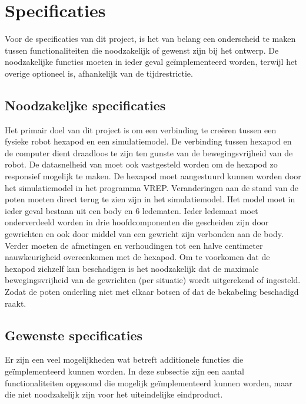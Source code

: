 \documentclass[10pt,a4paper]{article}
\begin{document}
\fi

\section{Specificaties}

Voor de specificaties van dit project, is het van belang een onderscheid te maken tussen functionaliteiten die noodzakelijk of gewenst zijn bij het ontwerp. De noodzakelijke functies moeten in ieder geval ge\"implementeerd worden, terwijl het overige optioneel is, afhankelijk van de tijdrestrictie.

\subsection{Noodzakeljke specificaties}
Het primair doel van dit project is om een verbinding te cre\"eren tussen een fysieke robot hexapod en een simulatiemodel. De verbinding tussen hexapod en de computer dient draadloos te zijn ten gunste van de bewegingsvrijheid van de robot. De datasnelheid van moet ook vastgesteld worden om de hexapod zo responsief mogelijk te maken. De hexapod moet aangestuurd kunnen worden door het simulatiemodel in het programma VREP. Veranderingen aan de stand van de poten moeten direct terug te zien zijn in het simulatiemodel. Het model moet in ieder geval bestaan uit een body en 6 ledematen. Ieder ledemaat moet onderverdeeld worden in drie hoofdcomponenten die gescheiden zijn door gewrichten en ook door middel van een gewricht zijn verbonden aan de body. Verder moeten de afmetingen en verhoudingen tot een halve centimeter nauwkeurigheid overeenkomen met de hexapod.
Om te voorkomen dat de hexapod zichzelf kan beschadigen is het noodzakelijk dat de maximale bewegingsvrijheid van de gewrichten (per situatie) wordt uitgerekend of ingesteld. Zodat de poten onderling niet met elkaar botsen of dat de bekabeling beschadigd raakt.

\subsection{Gewenste specificaties}
Er zijn een veel mogelijkheden wat betreft additionele functies die ge\"implementeerd kunnen worden. In deze subsectie zijn een aantal functionaliteiten opgesomd die mogelijk ge\"implementeerd kunnen worden, maar die niet noodzakelijk zijn voor het uiteindelijke eindproduct.
\end{document}
